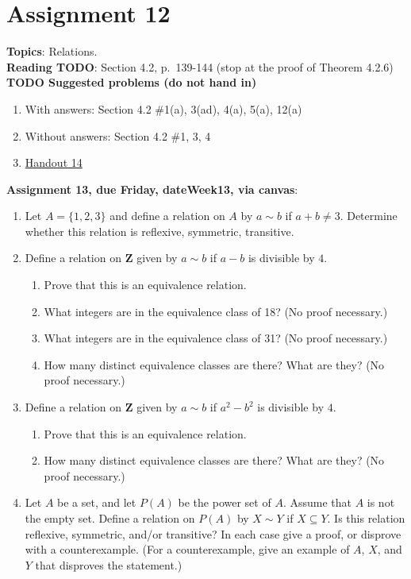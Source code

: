 \documentclass[12pt]{article}
\begin{document}
\section[12 (due \csname dateWeek12\endcsname): Relations]{Assignment 12}

\textbf{Topics}: Relations.
\\

\noindent \textbf{Reading TODO}: Section 4.2, p.~139-144 (stop at the proof of Theorem 4.2.6)
\\



\noindent \textbf{TODO Suggested problems (do not hand in)}

\begin{enumerate}
\item With answers: Section 4.2 \#1(a), 3(ad), 4(a), 5(a), 12(a)
\item Without answers: Section 4.2 \#1, 3, 4
\item \href{https://www.math.emory.edu/~dzb/teaching/250Fall2021/handouts/250-H14-equivalence-relations.pdf}{Handout 14}
\end{enumerate}


\noindent \textbf{Assignment 13, due Friday, \csname dateWeek13\endcsname, via canvas}:
\begin{enumerate}
\item Let $A = \{1,2,3\}$ and define a relation on $A$ by $a \sim b$ if $a + b \neq 3$. Determine whether this relation is reflexive, symmetric, transitive.
\item Define a relation on $\mathbf{Z}$ given by $a \sim b$ if $a-b$ is divisible by $4$.
 \begin{enumerate}
 \item Prove that this is an equivalence relation.
 \item What integers are in the equivalence class of 18? (No proof necessary.)
 \item What integers are in the equivalence class of 31? (No proof necessary.) 
 \item How many distinct equivalence classes are there? What are they? (No proof necessary.)
 \end{enumerate}
\item Define a relation on $\mathbf{Z}$ given by $a \sim b$ if $a^2-b^2$ is divisible by $4$.
 \begin{enumerate}
 \item Prove that this is an equivalence relation.
 \item How many distinct equivalence classes are there? What are they? (No proof necessary.)
 \end{enumerate} 
\item Let $A$ be a set, and let $P(A)$ be the power set of $A$. Assume that $A$ is not the empty set. Define a relation on $P(A)$ by $X \sim Y$ if $X \subseteq Y$. Is this relation reflexive, symmetric, and/or transitive? In each case give a proof, or disprove with a counterexample. (For a counterexample, give an example of $A$, $X$, and $Y$ that disproves the statement.)
\end{enumerate}
\end{document}
